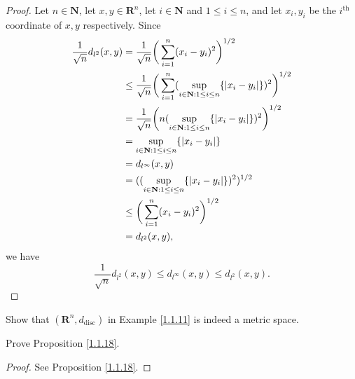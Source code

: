 \begin{proof}
    Let \(n \in \mathbf{N}\), let \(x, y \in \mathbf{R}^n\), let \(i \in \mathbf{N}\) and \(1 \leq i \leq n\), and let \(x_i, y_i\) be the \(i^{\text{th}}\) coordinate of \(x, y\) respectively.
    Since
    \begin{align*}
        \frac{1}{\sqrt{n}} d_{l^2}(x, y) & = \frac{1}{\sqrt{n}} \bigg(\sum_{i = 1}^n (x_i - y_i)^2\bigg)^{1 / 2}                                                         \\
                                         & \leq \frac{1}{\sqrt{n}} \bigg(\sum_{i = 1}^n (\sup_{i \in \mathbf{N} : 1 \leq i \leq n} \{\abs*{x_i - y_i}\})^2\bigg)^{1 / 2} \\
                                         & = \frac{1}{\sqrt{n}} \bigg(n (\sup_{i \in \mathbf{N} : 1 \leq i \leq n} \{\abs*{x_i - y_i}\})^2\bigg)^{1 / 2}                 \\
                                         & = \sup_{i \in \mathbf{N} : 1 \leq i \leq n} \{\abs*{x_i - y_i}\}                                                              \\
                                         & = d_{l^\infty}(x, y)                                                                                                          \\
                                         & = ((\sup_{i \in \mathbf{N} : 1 \leq i \leq n} \{\abs*{x_i - y_i}\})^2)^{1 / 2}                                                \\
                                         & \leq \bigg(\sum_{i = 1}^n (x_i - y_i)^2\bigg)^{1 / 2}                                                                         \\
                                         & = d_{l^2}(x, y),
    \end{align*}
    we have
    \[
        \frac{1}{\sqrt{n}} d_{l^2}(x, y) \leq d_{l^\infty}(x, y) \leq d_{l^2}(x, y).
    \]
\end{proof}

\begin{exercise}\label{ex 1.1.11}
    Show that \((\mathbf{R}^n, d_{\text{disc}})\) in Example \ref{1.1.11} is indeed a metric space.
\end{exercise}

\begin{exercise}\label{ex 1.1.12}
    Prove Proposition \ref{1.1.18}.
\end{exercise}

\begin{proof}
    See Proposition \ref{1.1.18}.
\end{proof}

